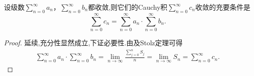 \documentclass[../../main.tex]{subfiles}
\begin{document}
\begin{corollary}\label{corollary:收敛级数Cauchy积收敛则就等于级数积}
设级数\(\sum_{n = 0}^{\infty} a_n\)，\(\sum_{n = 0}^{\infty} b_n\)都收敛,则它们的Cauchy积\(\sum_{n = 0}^{\infty} c_n\)收敛的充要条件是
\[
\sum_{n = 0}^{\infty} c_n = \sum_{n = 0}^{\infty} a_n \cdot \sum_{n = 0}^{\infty} b_n. 
\]
\end{corollary}
\begin{proof}
延续,充分性显然成立,下证必要性.由及Stolz定理可得
\begin{align*}
\sum_{n=0}^{\infty}{a_n}\cdot \sum_{n=0}^{\infty}{b_n}=\lim_{n\rightarrow \infty} \frac{\sum\limits_{j=0}^n{S_j}}{n}=\lim_{n\rightarrow \infty} S_n=\sum_{n=0}^{\infty}{c_n}.
\end{align*}
\end{proof}
\end{document}
